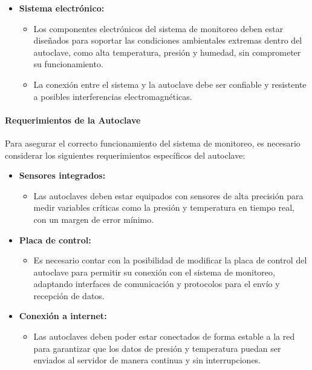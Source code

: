 \begin{itemize}
    \item \textbf{Sistema electrónico:}
    \begin{itemize}
        \item Los componentes electrónicos del sistema de monitoreo deben estar diseñados para soportar las condiciones ambientales extremas dentro del autoclave, como alta temperatura, presión y humedad, sin comprometer su funcionamiento.
        \item La conexión entre el sistema y la autoclave debe ser confiable y resistente a posibles interferencias electromagnéticas.
    \end{itemize}
\end{itemize}

\paragraph{Requerimientos de la Autoclave}

Para asegurar el correcto funcionamiento del sistema de monitoreo, es necesario considerar los siguientes requerimientos específicos del autoclave:
\begin{itemize}
    \item \textbf{Sensores integrados:}
    \begin{itemize}
        \item Las autoclaves deben estar equipados con sensores de alta precisión para medir variables críticas como la presión y temperatura en tiempo real, con un margen de error mínimo.
    \end{itemize}

    \item \textbf{Placa de control:}
    \begin{itemize}
        \item Es necesario contar con la posibilidad de modificar la placa de control del autoclave para permitir su conexión con el sistema de monitoreo, adaptando interfaces de comunicación y protocolos para el envío y recepción de datos.
    \end{itemize}
    
    \item \textbf{Conexión a internet:}
    \begin{itemize}
        \item Las autoclaves deben poder estar conectados de forma estable a la red para garantizar que los datos de presión y temperatura puedan ser enviados al servidor de manera continua y sin interrupciones.
    \end{itemize}
\end{itemize}


